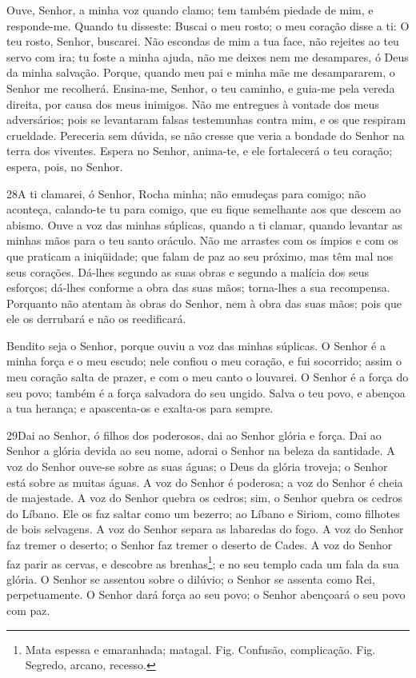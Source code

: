Ouve, Senhor, a minha voz quando clamo; tem também piedade de mim,
e responde-me. Quando tu disseste: Buscai o meu rosto; o meu
coração disse a ti: O teu rosto, Senhor, buscarei. Não escondas
de mim a tua face, não rejeites ao teu servo com ira; tu foste a
minha ajuda, não me deixes nem me desampares, ó Deus da minha
salvação. Porque, quando meu pai e minha mãe me desampararem,
o Senhor me recolherá. Ensina-me, Senhor, o teu caminho, e
guia-me pela vereda direita, por causa dos meus inimigos. Não
me entregues à vontade dos meus adversários; pois se levantaram
falsas testemunhas contra mim, e os que respiram crueldade.
Pereceria sem dúvida, se não cresse que veria a bondade do
Senhor na terra dos viventes. Espera no Senhor, anima-te, e
ele fortalecerá o teu coração; espera, pois, no Senhor.

\bigskip

\lettrine{28}{}A ti clamarei, ó Senhor, Rocha minha; não
emudeças para comigo; não aconteça, calando-te tu para comigo, que
eu fique semelhante aos que descem ao abismo. Ouve a voz das
minhas súplicas, quando a ti clamar, quando levantar as minhas mãos
para o teu santo oráculo. Não me arrastes com os ímpios e com os
que praticam a iniqüidade; que falam de paz ao seu próximo, mas têm
mal nos seus corações. Dá-lhes segundo as suas obras e segundo a
malícia dos seus esforços; dá-lhes conforme a obra das suas mãos;
torna-lhes a sua recompensa. Porquanto não atentam às obras do
Senhor, nem à obra das suas mãos; pois que ele os derrubará e não os
reedificará.

Bendito seja o Senhor, porque ouviu a voz das minhas súplicas.
O Senhor é a minha força e o meu escudo; nele confiou o meu
coração, e fui socorrido; assim o meu coração salta de prazer, e com
o meu canto o louvarei. O Senhor é a força do seu povo; também é
a força salvadora do seu ungido. Salva o teu povo, e abençoa a
tua herança; e apascenta-os e exalta-os para sempre.

\bigskip

\lettrine{29}{}Dai ao Senhor, ó filhos dos poderosos, dai ao
Senhor glória e força. Dai ao Senhor a glória devida ao seu
nome, adorai o Senhor na beleza da santidade. A voz do Senhor
ouve-se sobre as suas águas; o Deus da glória troveja; o Senhor está
sobre as muitas águas. A voz do Senhor é poderosa; a voz do
Senhor é cheia de majestade. A voz do Senhor quebra os cedros;
sim, o Senhor quebra os cedros do Líbano. Ele os faz saltar como
um bezerro; ao Líbano e Siriom, como filhotes de bois selvagens.
A voz do Senhor separa as labaredas do fogo. A voz do Senhor
faz tremer o deserto; o Senhor faz tremer o deserto de Cades. A
voz do Senhor faz parir as cervas, e descobre as
brenhas\footnote{Mata espessa e emaranhada; matagal. Fig. Confusão,
complicação. Fig. Segredo, arcano, recesso.}; e no seu templo cada
um fala da sua glória. O Senhor se assentou sobre o dilúvio;
o Senhor se assenta como Rei, perpetuamente. O Senhor dará
força ao seu povo; o Senhor abençoará o seu povo com paz.

